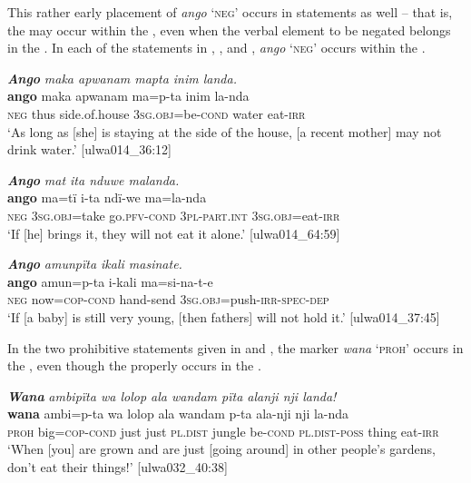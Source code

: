 This rather early placement of \textit{ango} ‘\textsc{neg}’ occurs in  statements as well -- that is, the  may occur within the , even when the verbal element to be negated belongs in the . In each of the  statements in , , and , \textit{ango} ‘\textsc{neg}’ occurs within the .

\ea%
    \label{ex:syntax:171}
          \textbf{\textit{Ango}} \textit{maka apwanam mapta inim landa.}\\
\gll    \textbf{ango}  maka  apwanam    ma=p-ta      inim  la-nda\\
    \textsc{neg}  thus  side.of.house  3\textsc{sg.obj}=be\textsc{{}-cond} water  eat-\textsc{irr}\\
\glt `As long as [she] is staying at the side of the house, [a recent mother] may not drink water.’ [ulwa014\_36:12]
\z

\ea%
    \label{ex:syntax:172}
          \textbf{\textit{Ango}} \textit{mat ita nduwe malanda.}\\
\gll    \textbf{ango}  ma=tï      i-ta        ndï-we      ma=la-nda\\
    \textsc{neg}  \textsc{3sg.obj}=take  go.\textsc{pfv-cond}  \textsc{3pl-part.int}  \textsc{3sg.obj}=eat-\textsc{irr}\\
\glt `If [he] brings it, they will not eat it alone.’ [ulwa014\_64:59]
\z

\ea%
    \label{ex:syntax:173}
          \textbf{\textit{Ango}} \textit{amunpïta ikali masinate.}\\
\gll    \textbf{ango}  amun=p-ta      i-kali    ma=si-na-t-e\\
    \textsc{neg}  now=\textsc{cop{}-cond} hand-send  \textsc{3sg.obj}=push-\textsc{irr-spec-dep}\\
\glt `If [a baby] is still very young, [then fathers] will not hold it.’ [ulwa014\_37:45]
\z

In the two  prohibitive statements given in  and , the  marker \textit{wana} ‘\textsc{proh’} occurs in the , even though the  properly occurs in the .


\ea%
    \label{ex:syntax:174}
          \textbf{\textit{Wana}} \textit{ambipïta wa lolop ala wandam pïta alanji nji landa!}\\
\gll    \textbf{wana}  ambi=p-ta      wa  lolop  ala      wandam  p-ta     ala-nji      nji    la-nda\\
    \textsc{proh}  big=\textsc{cop{}-cond} just  just    \textsc{pl.dist}  jungle    be\textsc{{}-cond}    \textsc{pl.dist-poss}  thing  eat-\textsc{irr}\\
\glt `When [you] are grown and are just [going around] in other people’s gardens, don’t eat   their things!’ [ulwa032\_40:38]
\z

